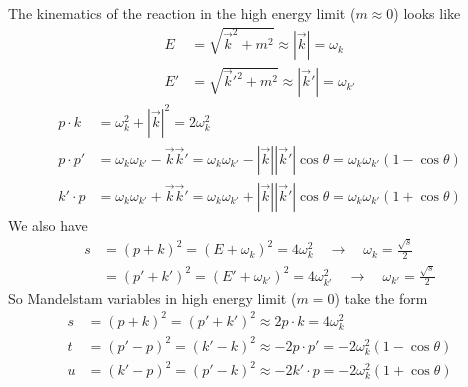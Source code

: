 \documentclass[TheoreticalPhy_ModB.tex]{subfiles}
\begin{document}
\begin{figure}[H]
\centering

\end{figure}

The kinematics of the reaction in the high energy limit ($m\approx0$) looks like
\begin{align*}
E&=\sqrt{\vec k^2+m^2}\approx|\vec k|=\omega_k\\
E'&=\sqrt{\vec k'^2+m^2}\approx|\vec k'|=\omega_{k'}
\end{align*}
\begin{align*}
p\cdot k&=\omega_k^2+|\vec k|^2=2\omega_k^2\\
p\cdot p'&=\omega_k\omega_{k'}-\vec k\vec k'=\omega_k\omega_{k'}-|\vec k||\vec k'|\cos\theta=\omega_k\omega_{k'}(1-\cos\theta)\\
k'\cdot p&=\omega_k\omega_{k'}+\vec k\vec k'=\omega_k\omega_{k'}+|\vec k||\vec k'|\cos\theta=\omega_k\omega_{k'}(1+\cos\theta)
\end{align*}
We also have
\begin{align*}
s&=(p+k)^2=(E+\omega_k)^2=4\omega_k^2 \quad\rightarrow\quad \omega_k=\frac{\sqrt s}{2}\\
&=(p'+k')^2=(E'+\omega_{k'})^2=4\omega_{k'}^2 \quad\rightarrow\quad \omega_{k'}=\frac{\sqrt s}{2}
\end{align*}
So Mandelstam variables in high energy limit ($m=0$) take the form
\begin{align*}
s&=(p+k)^2=(p'+k')^2\approx2p\cdot k=4\omega_k^2\\
t&=(p'-p)^2=(k'-k)^2\approx -2p\cdot p'=-2\omega_k^2(1-\cos\theta)\\
u&=(k'-p)^2=(p'-k)^2\approx-2k'\cdot p=-2\omega_k^2(1+\cos\theta)
\end{align*}
\end{document}
